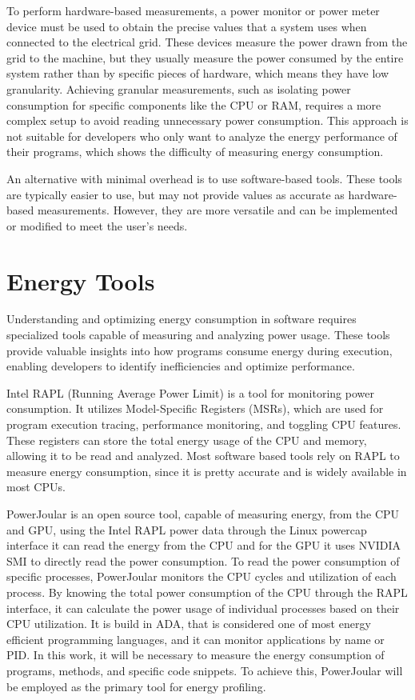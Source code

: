To perform hardware-based measurements, a power monitor or power meter device\cite{hackenberg2013power,ge2009powerpack} must be used to obtain the precise values that a system uses when connected to the electrical grid. These devices measure the power drawn from the grid to the machine, but they usually measure the power consumed by the entire system rather than by specific pieces of hardware, which means they have low granularity. Achieving granular measurements, such as isolating power consumption for specific components like the CPU or RAM, requires a more complex setup to avoid reading unnecessary power consumption. This approach is not suitable for developers who only want to analyze the energy performance of their programs, which shows the difficulty of measuring energy consumption.

An alternative with minimal overhead is to use software-based tools. These tools are typically easier to use, but may not provide values as accurate as hardware-based measurements. However, they are more versatile and can be implemented or modified to meet the user's needs. 

\section{Energy Tools} \label{sec:background_energy}



Understanding and optimizing energy consumption in software requires specialized tools capable of measuring and analyzing power usage. These tools provide valuable insights into how programs consume energy during execution, enabling developers to identify inefficiencies and optimize performance.

Intel RAPL (Running Average Power Limit)\cite{intel_rapl} is a tool for monitoring power consumption. It utilizes Model-Specific Registers (MSRs), which are used for program execution tracing, performance monitoring, and toggling CPU features. These registers can store the total energy usage of the CPU and memory, allowing it to be read and analyzed. Most software based tools rely on RAPL to measure energy consumption, since it is pretty accurate and is widely available in most CPUs.

PowerJoular \cite{noureddine-ie-2022} is an open source tool, capable of measuring energy, from the CPU and GPU, using the Intel RAPL power data through the Linux powercap interface it can read the energy from the CPU and for the GPU it uses NVIDIA SMI to directly read the power consumption.
To read the power consumption of specific processes, PowerJoular monitors the CPU cycles and utilization of each process. By knowing the total power consumption of the CPU through the RAPL interface, it can calculate the power usage of individual processes based on their CPU utilization.
It is build in ADA, that is considered one of most energy efficient programming languages\cite{PEREIRA2021102609}, and it can monitor applications by name or PID. In this work, it will be necessary to measure the energy consumption of programs, methods, and specific code snippets. To achieve this, PowerJoular will be employed as the primary tool for energy profiling.

